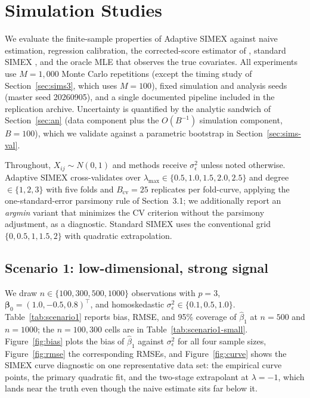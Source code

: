 
\section{Simulation Studies}\label{sec:sims}

We evaluate the finite-sample properties of Adaptive SIMEX against
naive estimation, regression calibration, the corrected-score estimator
of \citealt{nakamura1990}, standard SIMEX \citep{cook1994}, and the
oracle MLE that observes the true covariates. All experiments use
$M=1{,}000$ Monte Carlo repetitions (except the timing study of
Section~\ref{sec:sims3}, which uses $M=100$), fixed simulation and
analysis seeds (master seed 20260905), and a single documented pipeline
included in the replication archive. Uncertainty is quantified by the
analytic sandwich of Section~\ref{sec:an} (data component plus the
$O(B^{-1})$ simulation component, $B=100$), which we validate against a
parametric bootstrap in Section~\ref{sec:sims-val}.

Throughout, $X_{ij}\sim N(0,1)$ and methods receive
$\sigma^2_{\epsilon}$ unless noted otherwise. Adaptive SIMEX
cross-validates over $\lambda_{\max}\in\{0.5,1.0,1.5,2.0,2.5\}$ and
degree $\in\{1,2,3\}$ with five folds and $B_{\mathrm{cv}}=25$
replicates per fold-curve, applying the one-standard-error parsimony
rule of Section~3.1; we additionally report an \emph{argmin} variant
that minimizes the CV criterion without the parsimony adjustment, as a
diagnostic. Standard SIMEX uses the conventional grid
$\{0,0.5,1,1.5,2\}$ with quadratic extrapolation.

\subsection{Scenario 1: low-dimensional, strong signal}
\label{sec:sims1}

We draw $n\in\{100,300,500,1000\}$ observations with $p=3$,
$\bm\beta_0=(1.0,-0.5,0.8)^\top$, and homoskedastic
$\sigma^2_\epsilon\in\{0.1,0.5,1.0\}$. Table~\ref{tab:scenario1}
reports bias, RMSE, and 95\% coverage of $\hat\beta_1$ at $n=500$ and
$n=1000$; the $n=100,300$ cells are in Table~\ref{tab:scenario1-small}.
Figure~\ref{fig:bias} plots the bias of $\hat\beta_1$ against
$\sigma^2_\epsilon$ for all four sample sizes, Figure~\ref{fig:rmse}
the corresponding RMSEs, and Figure~\ref{fig:curve} shows the SIMEX
curve diagnostic on one representative data set: the empirical curve
points, the primary quadratic fit, and the two-stage extrapolant at
$\lambda=-1$, which lands near the truth even though the naive
estimate sits far below it.

